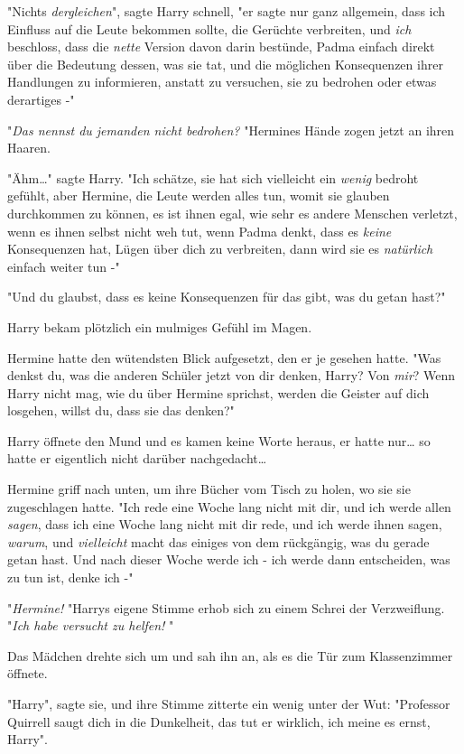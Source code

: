 {"Nichts \emph{dergleichen}", sagte Harry schnell, "er sagte nur ganz allgemein, dass ich Einfluss auf die Leute bekommen sollte, die Gerüchte verbreiten, und \emph{ich} beschloss, dass die \emph{nette} Version davon darin bestünde, Padma einfach direkt über die Bedeutung dessen, was sie tat, und die möglichen Konsequenzen ihrer Handlungen zu informieren, anstatt zu versuchen, sie zu bedrohen oder etwas derartiges -"

"\emph{Das nennst du jemanden nicht bedrohen?} "Hermines Hände zogen jetzt an ihren Haaren.

"Ähm…" sagte Harry. "Ich schätze, sie hat sich vielleicht ein \emph{wenig} bedroht gefühlt, aber Hermine, die Leute werden alles tun, womit sie glauben durchkommen zu können, es ist ihnen egal, wie sehr es andere Menschen verletzt, wenn es ihnen selbst nicht weh tut, wenn Padma denkt, dass es \emph{keine} Konsequenzen hat, Lügen über dich zu verbreiten, dann wird sie es \emph{natürlich} einfach weiter tun -"

"Und du glaubst, dass es keine Konsequenzen für das gibt, was du getan hast?"

Harry bekam plötzlich ein mulmiges Gefühl im Magen.

Hermine hatte den wütendsten Blick aufgesetzt, den er je gesehen hatte. "Was denkst du, was die anderen Schüler jetzt von dir denken, Harry? Von \emph{mir}? Wenn Harry nicht mag, wie du über Hermine sprichst, werden die Geister auf dich losgehen, willst du, dass sie das denken?"

Harry öffnete den Mund und es kamen keine Worte heraus, er hatte nur… so hatte er eigentlich nicht darüber nachgedacht…

Hermine griff nach unten, um ihre Bücher vom Tisch zu holen, wo sie sie zugeschlagen hatte. "Ich rede eine Woche lang nicht mit dir, und ich werde allen \emph{sagen}, dass ich eine Woche lang nicht mit dir rede, und ich werde ihnen sagen, \emph{warum}, und \emph{vielleicht} macht das einiges von dem rückgängig, was du gerade getan hast. Und nach dieser Woche werde ich - ich werde dann entscheiden, was zu tun ist, denke ich -"

"\emph{Hermine!} "Harrys eigene Stimme erhob sich zu einem Schrei der Verzweiflung. "\emph{Ich habe versucht zu helfen!} "

Das Mädchen drehte sich um und sah ihn an, als es die Tür zum Klassenzimmer öffnete.

"Harry", sagte sie, und ihre Stimme zitterte ein wenig unter der Wut: "Professor Quirrell saugt dich in die Dunkelheit, das tut er wirklich, ich meine es ernst, Harry".

}
